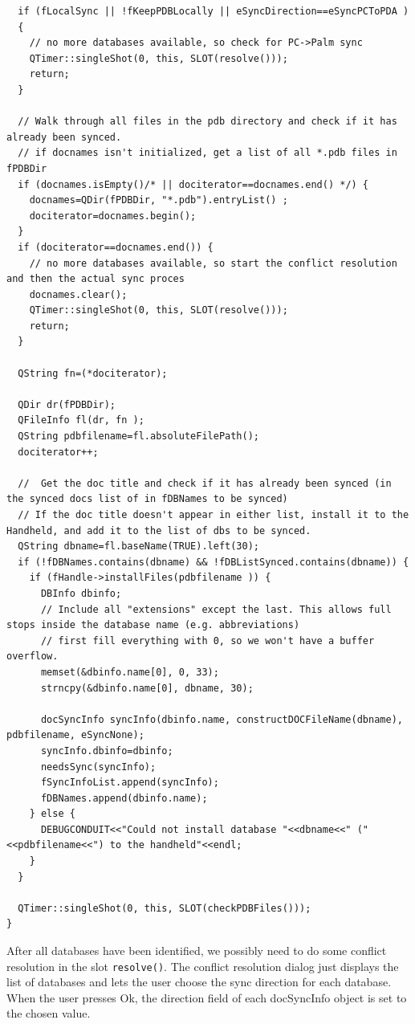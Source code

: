 \documentclass[10pt,a4paper]{article}
\newcommand{\code}[1]{{\small\texttt{#1}}}
\begin{document}
{\begin{verbatim}
  if (fLocalSync || !fKeepPDBLocally || eSyncDirection==eSyncPCToPDA )
  {
    // no more databases available, so check for PC->Palm sync
    QTimer::singleShot(0, this, SLOT(resolve()));
    return;
  }
  
  // Walk through all files in the pdb directory and check if it has already been synced.
  // if docnames isn't initialized, get a list of all *.pdb files in fPDBDir
  if (docnames.isEmpty()/* || dociterator==docnames.end() */) {
    docnames=QDir(fPDBDir, "*.pdb").entryList() ;
    dociterator=docnames.begin();
  }
  if (dociterator==docnames.end()) {
    // no more databases available, so start the conflict resolution and then the actual sync proces
    docnames.clear();
    QTimer::singleShot(0, this, SLOT(resolve()));
    return;
  }

  QString fn=(*dociterator);

  QDir dr(fPDBDir);
  QFileInfo fl(dr, fn );
  QString pdbfilename=fl.absoluteFilePath();
  dociterator++;
  
  //  Get the doc title and check if it has already been synced (in the synced docs list of in fDBNames to be synced)
  // If the doc title doesn't appear in either list, install it to the Handheld, and add it to the list of dbs to be synced.
  QString dbname=fl.baseName(TRUE).left(30);
  if (!fDBNames.contains(dbname) && !fDBListSynced.contains(dbname)) {
    if (fHandle->installFiles(pdbfilename )) {
      DBInfo dbinfo;
      // Include all "extensions" except the last. This allows full stops inside the database name (e.g. abbreviations)
      // first fill everything with 0, so we won't have a buffer overflow.
      memset(&dbinfo.name[0], 0, 33);
      strncpy(&dbinfo.name[0], dbname, 30);

      docSyncInfo syncInfo(dbinfo.name, constructDOCFileName(dbname), pdbfilename, eSyncNone);
      syncInfo.dbinfo=dbinfo;
      needsSync(syncInfo);
      fSyncInfoList.append(syncInfo);
      fDBNames.append(dbinfo.name);
    } else {
      DEBUGCONDUIT<<"Could not install database "<<dbname<<" ("<<pdbfilename<<") to the handheld"<<endl;
    }
  }
  
  QTimer::singleShot(0, this, SLOT(checkPDBFiles()));
}
\end{verbatim}
}

After all databases have been identified, we possibly need to do some conflict resolution in the slot \code{resolve()}. The conflict resolution dialog just displays the list of databases and lets the user choose the sync direction for each database. When the user presses Ok, the direction field of each docSyncInfo object is set to the chosen value.
\end{document}

